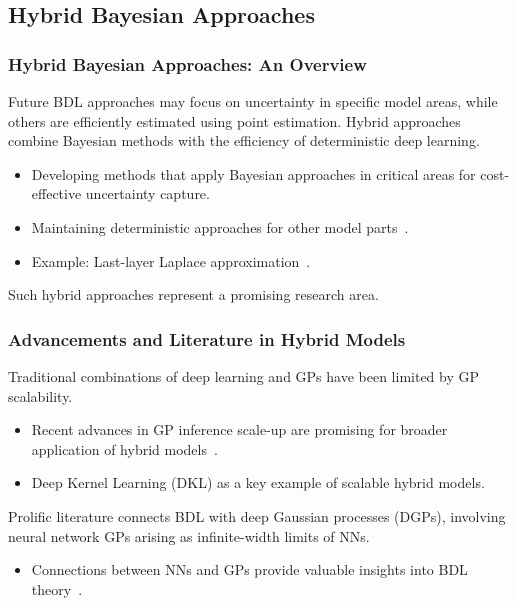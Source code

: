 \documentclass[9pt]{beamer}
\begin{document}
\subsection{Hybrid Bayesian Approaches}

\begin{frame}
\frametitle{Hybrid Bayesian Approaches: An Overview}

Future BDL approaches may focus on uncertainty in specific model areas, while others are efficiently estimated using point estimation. Hybrid approaches combine Bayesian methods with the efficiency of deterministic deep learning.

\begin{itemize}
    \item Developing methods that apply Bayesian approaches in critical areas for cost-effective uncertainty capture.
    \item Maintaining deterministic approaches for other model parts~\citep{daxberger2021a}.
    \item Example: Last-layer Laplace approximation~\citep{daxberger2021b}.
\end{itemize}

Such hybrid approaches represent a promising research area.

\end{frame}

\begin{frame}
\frametitle{Advancements and Literature in Hybrid Models}

Traditional combinations of deep learning and GPs have been limited by GP scalability.

\begin{itemize}
    \item Recent advances in GP inference scale-up are promising for broader application of hybrid models~\citep{wilson2016deep}.
    \item Deep Kernel Learning (DKL) as a key example of scalable hybrid models.
\end{itemize}

Prolific literature connects BDL with deep Gaussian processes (DGPs), involving neural network GPs arising as infinite-width limits of NNs.

\begin{itemize}
    \item Connections between NNs and GPs provide valuable insights into BDL theory~\citep{damianou2013,agrawal2020,neal1996,matthews2018}.
\end{itemize}
\end{frame}
\end{document}
